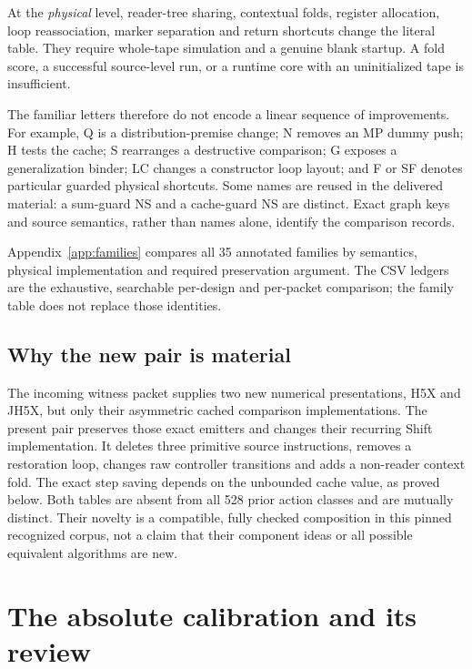 \documentclass[10pt,letterpaper]{article}
\begin{document}
At the \emph{physical} level, reader-tree sharing, contextual folds,
register allocation, loop reassociation, marker separation and return
shortcuts change the literal table.  They require whole-tape simulation
and a genuine blank startup.  A fold score, a successful source-level
run, or a runtime core with an uninitialized tape is insufficient.

The familiar letters therefore do not encode a linear sequence of
improvements.  For example, Q is a distribution-premise change; N
removes an MP dummy push; H tests the cache; S rearranges a destructive
comparison; G exposes a generalization binder; LC changes a constructor
loop layout; and F or SF denotes particular guarded physical shortcuts.
Some names are reused in the delivered material: a sum-guard NS and a
cache-guard NS are distinct.  Exact graph keys and source semantics,
rather than names alone, identify the comparison records.

Appendix~\ref{app:families} compares all 35 annotated families by
semantics, physical implementation and required preservation argument.
The CSV ledgers are the exhaustive, searchable per-design and per-packet
comparison; the family table does not replace those identities.

\subsection{Why the new pair is material}

The incoming witness packet supplies two new numerical presentations,
H5X and JH5X, but only their asymmetric cached comparison implementations.
The present pair preserves those exact emitters and changes their
recurring Shift implementation.  It deletes three primitive source
instructions, removes a restoration loop, changes raw controller
transitions and adds a non-reader context fold.  The exact step saving
depends on the unbounded cache value, as proved below.  Both tables
are absent from all 528 prior action classes and are mutually distinct.
Their novelty is a compatible, fully checked composition in this
pinned recognized corpus, not a claim that their component ideas or
all possible equivalent algorithms are new.



\section{The absolute calibration and its review}
\end{document}
